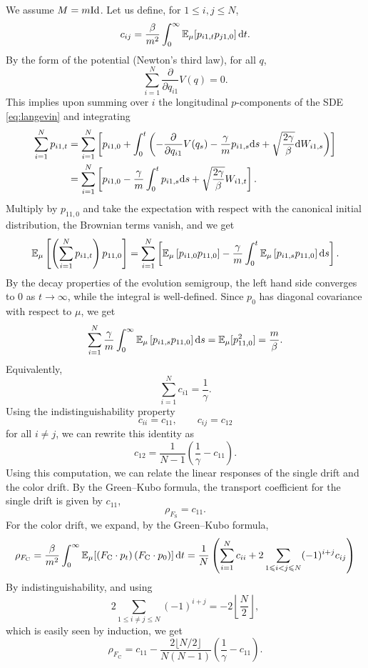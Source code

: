\begin{example}\label{ex:relating_linear_responses}
We assume $M=m\mathrm{Id}$. Let us define, for $1\leq i,j\leq N$,
\[c_{ij}=\frac{\beta}{m^2} \int_{0}^\infty \mathbb{E}_\mu[p_{i1,t}p_{j1,0}]\,\mathrm{d} t.\]
By the form of the potential (Newton's third law), for all $q$,
\[\sum_{i=1}^N \frac{\partial}{\partial q_{i1}}V(q)=0.\]
This implies upon summing over $i$ the longitudinal $p$-components of the SDE \eqref{eq:langevin} and integrating
\begin{align*}\sum_{i=1}^N p_{i1,t}&= \sum_{i=1}^N \left[p_{i1,0}+\int_0^t \left(-\frac{\partial}{\partial q_{i1}}V(q_s)-\frac{\gamma}{m} p_{i1,s}\mathrm{d} s +\sqrt{\frac{2\gamma}\beta}\mathrm{d} W_{i1,s}\right)\right]\\
    &=\sum_{i=1}^N \left[p_{i1,0}-\frac{\gamma}{m}\int_0^t  p_{i1,s}\mathrm{d} s +\sqrt{\frac{2\gamma}\beta} W_{i1,t}\right].\end{align*}
Multiply by $p_{11,0}$ and take the expectation with respect with the canonical initial distribution, the Brownian terms vanish, and we get
\begin{equation}
    \mathbb{E}_\mu\left[\left(\sum_{i=1}^N p_{i1,t}\right)p_{11,0}\right]=\sum_{i=1}^N\left[ \mathbb{E}_\mu\left[p_{i1,0}p_{11,0}\right]-\frac{\gamma}{m}\int_0^t \mathbb{E}_\mu\left[p_{i1,s}p_{11,0}\right]\mathrm{d} s\right].
\end{equation}
By the decay properties of the evolution semigroup, the left hand side converges to $0$ as $t\to \infty$, while the integral is well-defined. Since $p_0$ has diagonal covariance with respect to $\mu$, we get
\begin{equation}
    \sum_{i=1}^N \frac{\gamma}m\int_0^\infty \mathbb{E}_\mu\left[p_{i1,s}p_{11,0}\right]\mathrm{d} s=\mathbb{E}_\mu[p_{11,0}^2]=\frac{m}{\beta}.
\end{equation}
Equivalently, 
\[\sum_{i=1}^N c_{i1}=\frac{1}{\gamma}.\]
Using the indistinguishability property
 \[c_{ii}=c_{11},\qquad c_{ij}=c_{12}\] for all $i\neq j$,
 we can rewrite this identity as 
 \begin{equation}\label{eq:c12_c11_relation}c_{12}=\frac{1}{N-1}\left(\frac{1}{\gamma}-c_{11}\right).\end{equation}
Using this computation, we can relate the linear responses of the single drift and the color drift.
By the Green--Kubo formula, the transport coefficient for the single drift is given by $c_{11}$,
\[\rho_{F_{\mathrm{S}}}=c_{11}.\]
For the color drift, we expand, by the Green--Kubo formula,
\[\rho_{F_{\mathrm{C}}}=\frac{\beta}{m^2} \int_0^\infty \mathbb{E}_\mu[\left(F_{\mathrm{C}}\cdot p_t\right)\left(F_{\mathrm{C}}\cdot p_0\right)]\,\mathrm{d} t=\frac1N\left(\sum_{i=1}^N c_{ii} + 2\sum_{1\leqslant i< j\leqslant N}(-1)^{i+j}c_{ij}\right)\]
By indistinguishability, and using
\[2\sum_{1\leq i\neq j\leq N}(-1)^{i+j}=-2\left\lfloor \frac{N}{2}\right\rfloor,\]
which is easily seen by induction, we get
\begin{equation}
    \rho_{F_{\mathrm{C}}}=c_{11}-\frac{2\lfloor N/2 \rfloor}{N(N-1)}\left(\frac1{\gamma}-c_{11}\right).
\end{equation}
\end{example}

